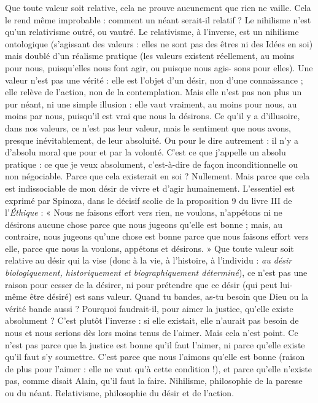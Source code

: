 Que toute valeur soit relative, cela ne prouve aucunement que rien ne
vaille. Cela le rend même improbable : comment un néant serait-il relatif ? Le
nihilisme n’est qu’un relativisme outré, ou vautré. Le relativisme, à l'inverse, est
un nihilisme ontologique (s'agissant des valeurs : elles ne sont pas des êtres ni
des Idées en soi) mais doublé d’un réalisme pratique (les valeurs existent réellement,
au moins pour nous, puisqu'elles nous font agir, ou puisque nous agis-
sons pour elles). Une valeur n’est pas une vérité : elle est l’objet d’un désir, non
d’une connaissance ; elle relève de l’action, non de la contemplation. Mais elle
n’est pas non plus un pur néant, ni une simple illusion : elle vaut vraiment, au
moins pour nous, au moins par nous, puisqu'il est vrai que nous la désirons. Ce
qu’il y a d’illusoire, dans nos valeurs, ce n’est pas leur valeur, mais le sentiment
que nous avons, presque inévitablement, de leur absoluité. Ou pour le dire
autrement : il n’y a d’absolu moral que pour et par la volonté. C’est ce que
j'appelle un absolu pratique : ce que je veux absolument, c’est-à-dire de façon
inconditionnelle ou non négociable. Parce que cela existerait en soi ? Nullement.
Mais parce que cela est indissociable de mon désir de vivre et d’agir
humainement. L'essentiel est exprimé par Spinoza, dans le décisif scolie de la
proposition 9 du livre III de l'{\it Éthique} : « Nous ne faisons effort vers rien, ne
voulons, n’appétons ni ne désirons aucune chose parce que nous jugeons
qu’elle est bonne ; mais, au contraire, nous jugeons qu’une chose est bonne
parce que nous faisons effort vers elle, parce que nous la voulons, appétons et
désirons. » Que toute valeur soit relative au désir qui la vise (donc à la vie, à
l’histoire, à l'individu : {\it au désir biologiquement, historiquement et biographiquement
déterminé}), ce n’est pas une raison pour cesser de la désirer, ni pour prétendre
que ce désir (qui peut lui-même être désiré) est sans valeur. Quand tu
bandes, as-tu besoin que Dieu ou la vérité bande aussi ? Pourquoi faudrait-il,
pour aimer la justice, qu’elle existe absolument ? C’est plutôt l’inverse : si elle
existait, elle n’aurait pas besoin de nous et nous serions dès lors moins tenus de
l'aimer. Mais cela n’est point. Ce n’est pas parce que la justice est bonne qu’il
faut l'aimer, ni parce qu’elle existe qu’il faut s’y soumettre. C’est parce que
nous l’aimons qu’elle est bonne (raison de plus pour l'aimer : elle ne vaut qu’à
cette condition !), et parce qu’elle n’existe pas, comme disait Alain, qu’il faut la
faire. Nihilisme, philosophie de la paresse ou du néant. Relativisme, philosophie
du désir et de l’action.


